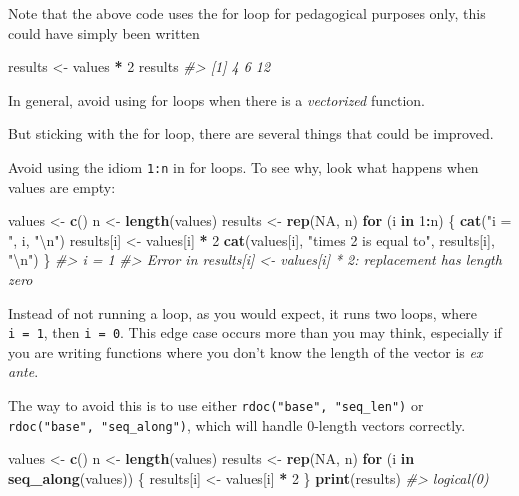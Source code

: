 \documentclass[]{book}
\newenvironment{Shaded}{\begin{snugshade}}{\end{snugshade}}
\newcommand{\KeywordTok}[1]{\textcolor[rgb]{0.13,0.29,0.53}{\textbf{#1}}}
\newcommand{\DecValTok}[1]{\textcolor[rgb]{0.00,0.00,0.81}{#1}}
\newcommand{\CharTok}[1]{\textcolor[rgb]{0.31,0.60,0.02}{#1}}
\newcommand{\StringTok}[1]{\textcolor[rgb]{0.31,0.60,0.02}{#1}}
\newcommand{\CommentTok}[1]{\textcolor[rgb]{0.56,0.35,0.01}{\textit{#1}}}
\newcommand{\OtherTok}[1]{\textcolor[rgb]{0.56,0.35,0.01}{#1}}
\newcommand{\ControlFlowTok}[1]{\textcolor[rgb]{0.13,0.29,0.53}{\textbf{#1}}}
\newcommand{\OperatorTok}[1]{\textcolor[rgb]{0.81,0.36,0.00}{\textbf{#1}}}
\newcommand{\NormalTok}[1]{#1}
\theoremstyle{definition}
\theoremstyle{definition}
\theoremstyle{definition}
\theoremstyle{remark}
\begin{document}
Note that the above code uses the for loop for pedagogical purposes
only, this could have simply been written

\begin{Shaded}
\begin{Highlighting}[]
\NormalTok{results <-}\StringTok{ }\NormalTok{values }\OperatorTok{*}\StringTok{ }\DecValTok{2}
\NormalTok{results}
\CommentTok{#> [1]  4  6 12}
\end{Highlighting}
\end{Shaded}

In general, avoid using for loops when there is a \emph{vectorized}
function.

But sticking with the for loop, there are several things that could be
improved.

Avoid using the idiom \texttt{1:n} in for loops. To see why, look what
happens when values are empty:

\begin{Shaded}
\begin{Highlighting}[]
\NormalTok{values <-}\StringTok{ }\KeywordTok{c}\NormalTok{()}
\NormalTok{n <-}\StringTok{ }\KeywordTok{length}\NormalTok{(values)}
\NormalTok{results <-}\StringTok{ }\KeywordTok{rep}\NormalTok{(}\OtherTok{NA}\NormalTok{, n)}
\ControlFlowTok{for}\NormalTok{ (i }\ControlFlowTok{in} \DecValTok{1}\OperatorTok{:}\NormalTok{n) \{}
  \KeywordTok{cat}\NormalTok{(}\StringTok{"i = "}\NormalTok{, i, }\StringTok{"}\CharTok{\textbackslash{}n}\StringTok{"}\NormalTok{)}
\NormalTok{  results[i] <-}\StringTok{ }\NormalTok{values[i] }\OperatorTok{*}\StringTok{ }\DecValTok{2}
  \KeywordTok{cat}\NormalTok{(values[i], }\StringTok{"times 2 is equal to"}\NormalTok{, results[i], }\StringTok{"}\CharTok{\textbackslash{}n}\StringTok{"}\NormalTok{)}
\NormalTok{\}}
\CommentTok{#> i =  1}
\CommentTok{#> Error in results[i] <- values[i] * 2: replacement has length zero}
\end{Highlighting}
\end{Shaded}

Instead of not running a loop, as you would expect, it runs two loops,
where \texttt{i\ =\ 1}, then \texttt{i\ =\ 0}. This edge case occurs
more than you may think, especially if you are writing functions where
you don't know the length of the vector is \emph{ex ante}.

The way to avoid this is to use either
\texttt{rdoc("base",\ "seq\_len")} or
\texttt{rdoc("base",\ "seq\_along")}, which will handle 0-length vectors
correctly.

\begin{Shaded}
\begin{Highlighting}[]
\NormalTok{values <-}\StringTok{ }\KeywordTok{c}\NormalTok{()}
\NormalTok{n <-}\StringTok{ }\KeywordTok{length}\NormalTok{(values)}
\NormalTok{results <-}\StringTok{ }\KeywordTok{rep}\NormalTok{(}\OtherTok{NA}\NormalTok{, n)}
\ControlFlowTok{for}\NormalTok{ (i }\ControlFlowTok{in} \KeywordTok{seq_along}\NormalTok{(values)) \{}
\NormalTok{  results[i] <-}\StringTok{ }\NormalTok{values[i] }\OperatorTok{*}\StringTok{ }\DecValTok{2}
\NormalTok{\}}
\KeywordTok{print}\NormalTok{(results)}
\CommentTok{#> logical(0)}
\end{Highlighting}
\end{Shaded}
\end{document}
